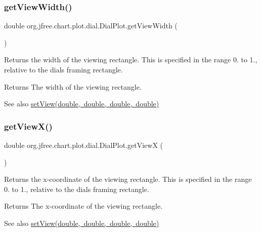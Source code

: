 \subsubsection{\texorpdfstring{get\+View\+Width()}{getViewWidth()}}
{\footnotesize\ttfamily double org.\+jfree.\+chart.\+plot.\+dial.\+Dial\+Plot.\+get\+View\+Width (\begin{DoxyParamCaption}{ }\end{DoxyParamCaption})}

Returns the width of the viewing rectangle. This is specified in the range 0. to 1., relative to the dial\textquotesingle{}s framing rectangle.

\begin{DoxyReturn}{Returns}
The width of the viewing rectangle.
\end{DoxyReturn}
\begin{DoxySeeAlso}{See also}
\mbox{\hyperlink{classorg_1_1jfree_1_1chart_1_1plot_1_1dial_1_1_dial_plot_ac66e780fbd6679eed711805ba1d47d77}{set\+View(double, double, double, double)}} 
\end{DoxySeeAlso}
\mbox{\label{classorg_1_1jfree_1_1chart_1_1plot_1_1dial_1_1_dial_plot_a62ca88c6259e7da0f683c23d94131fa8}} 
\subsubsection{\texorpdfstring{get\+View\+X()}{getViewX()}}
{\footnotesize\ttfamily double org.\+jfree.\+chart.\+plot.\+dial.\+Dial\+Plot.\+get\+ViewX (\begin{DoxyParamCaption}{ }\end{DoxyParamCaption})}

Returns the x-\/coordinate of the viewing rectangle. This is specified in the range 0. to 1., relative to the dial\textquotesingle{}s framing rectangle.

\begin{DoxyReturn}{Returns}
The x-\/coordinate of the viewing rectangle.
\end{DoxyReturn}
\begin{DoxySeeAlso}{See also}
\mbox{\hyperlink{classorg_1_1jfree_1_1chart_1_1plot_1_1dial_1_1_dial_plot_ac66e780fbd6679eed711805ba1d47d77}{set\+View(double, double, double, double)}} 
\end{DoxySeeAlso}
\mbox{\label{classorg_1_1jfree_1_1chart_1_1plot_1_1dial_1_1_dial_plot_ac3bba6749d33bc59f1a9f33a5f850db1}} 
